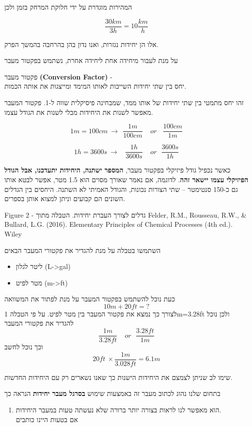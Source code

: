 \documentclass[
  hebrew,
  letterpaper,
  DIV=11,
  numbers=noendperiod]{scrreprt}
\begin{document}
{המהירות מוגדרת על ידי חלוקת המרחק בזמן ולכן}

\[\frac{30km}{3h} = 10\frac{km}{h}\]

{אלו הן יחידות נגזרות, ואנו נדון בהן בהרחבה בהמשך הפרק.}

{על מנת לעבור מיחידה אחת ליחידה אחרת, נשתמש בפקטור מעבר}

{פקטור מעבר} \textbf{(Conversion Factor) {}}{-\\
יחס בין שתי יחידות השייכות לאותו המימד ומייצגות את אותה הכמות.}

{זהו יחס מתמטי בין שתי יחידות של אותו ממד, שמבחינה פיסיקלית שווה ל}-{1.
פקטור המעבר מאפשר לשנות את היחידות מבלי לשנות את הגודל עצמו}.

\[1m = 100cm\  \rightarrow \ \ \frac{1m}{100cm}\ \ \ \ \ or \ \ \ \ \frac{100cm}{1m}\]

\[1h = 3600s\  \rightarrow \ \ \ \ \frac{1h}{3600s}\ \ \ \ \ or \ \ \ \frac{3600s}{1h}\]

{כאשר נכפיל גודל פיזיקלי בפקטור מעבר}, \textbf{{המספר ישתנה, היחידות
יתעדכנו, אבל הגודל הפיזיקלי עצמו יישאר זהה}}. {לדוגמה, אם נאמר שאורך
מסוים הוא 1.5 מטר, אפשר לבטא אותו גם כ}-{150 סנטימטר -- שתי הצורות
נכונות, והגודל האמיתי לא השתנה}. {היחסים בין הגדלים השונים הם קבועים
וניתן למצוא אותן בספרים.}

Figure {2 - גדלים לצורך העברת יחידות. הטבלה מתוך }Felder, R.M.,
Rousseau, R.W., \& Bullard, L.G. (2016). Elementary Principles of
Chemical Processes (4th ed.). Wiley

{השתמשו בטבלה על מנת להגדיר את פקטורי המעבר הבאים}

\begin{itemize}
\item
  {ליטר לגלון (}L-\textgreater gal{)}
\item
  {מטר לפיט (}m-\textgreater ft{)}
\end{itemize}

{כעת נוכל להשתמש בפקטור המעבר על מנת לפתור את המשוואה}
\[10m + 20ft = ?\] {לצורך כך נמצא את פקטור המעבר בין מטר לפיט. על פי
הטבלה} 1m=3.28ft {ולכן נוכל להגדיר את פקטורי המעבר}
\[\frac{1m}{3.28ft}\ \ \ \ \ or\ \ \ \frac{3.28ft}{1m}\] {וכך נוכל לחשב}
\[20ft\  \times \frac{1m}{3.028ft} = 6.1m\]

{שימו לב שניתן לצמצם את היחידות הישנות כך שאנו נשארים רק עם היחידות
החדשות.}

{בתחום שלנו נהוג לכתוב מעבר זה באמצעות שימוש \textbf{בסרגל מעבר יחידות}
הנראה כך}

\begin{enumerate}
\def\labelenumi{\arabic{enumi}.}
\item
  {הוא מאפשר לנו לראות בצורה יותר ברורה שלא נעשתה טעות במעבר היחידות.\\
  אם בטעות היינו כותבים}
\end{enumerate}
\end{document}
